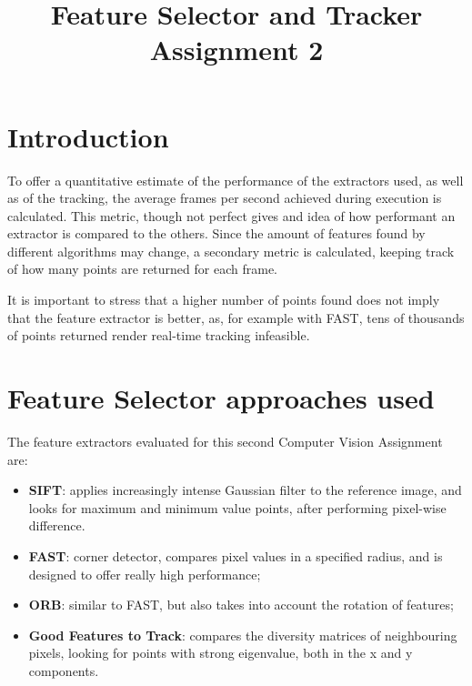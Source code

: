 \documentclass[conference]{IEEEtran}
\begin{document}
\title{Feature Selector and Tracker \\ Assignment 2}

\author{
}

\maketitle


\section{Introduction}

To offer a quantitative estimate of the performance of the extractors used, as well as of the tracking, 
the average frames per second achieved during execution is calculated. This metric, though  not perfect 
gives and idea of how performant an extractor is compared to the others.
Since the amount of features found by different algorithms may change, a secondary metric is calculated, 
keeping track of how many points are returned for each frame.

It is important to stress that a higher number of points found does not imply that the feature 
extractor is better, as, for example with FAST, tens of thousands of points returned render 
real-time tracking infeasible.


\section{Feature Selector approaches used}

The feature extractors evaluated for this second Computer Vision Assignment are: 
\begin{itemize}
	\item \textbf{SIFT}: applies increasingly intense Gaussian filter to the reference image, and looks for maximum and minimum value points, after performing pixel-wise difference.
	\item \textbf{FAST}: corner detector, compares pixel values in a specified radius, and is designed to offer really high performance; 
	\item \textbf{ORB}: similar to FAST, but also takes into account the rotation of features;
	\item \textbf{Good Features to Track}: compares the diversity matrices of neighbouring pixels, looking for points  with strong eigenvalue, both in the x and y components.
\end{itemize}
\end{document}
